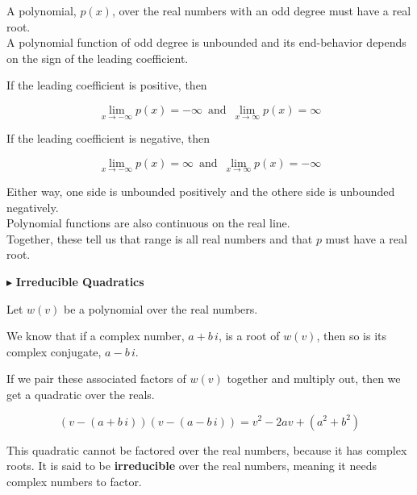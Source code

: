 \documentclass{ximera}
\begin{document}
\begin{explanation}


A polynomial, $p(x)$, over the real numbers with an odd degree must have a real root. \\




A polynomial function of odd degree is unbounded and its end-behavior depends on the sign of the leading coefficient.



If the leading coefficient is positive, then 

\[   \lim\limits_{x \to -\infty} p(x) = -\infty    \,   \text{ and } \,       \lim\limits_{x \to \infty} p(x) = \infty      \]



If the leading coefficient is negative, then 

\[   \lim\limits_{x \to -\infty} p(x) = \infty    \,   \text{ and } \,       \lim\limits_{x \to \infty} p(x) = -\infty      \]


Either way, one side is unbounded positively and the othere side is unbounded negatively. \\



Polynomial functions are also continuous on the real line. \\


Together, these tell us that range is all real numbers and that $p$ must have a real root.




\end{explanation}








$\blacktriangleright$  \textbf{Irreducible Quadratics}


Let $w(v)$ be a polynomial over the real numbers.

We know that if a complex number, $a + b \, i$, is a root of $w(v)$, then so is its complex conjugate, $a - b \,i$.

If we pair these associated factors of $w(v)$ together and multiply out, then we get a quadratic over the reals.

\[    (v - (a + b \, i)) (v -(a - b \, i))  = v^2 - 2a v + (a^2 + b^2)      \]


This quadratic cannot be factored over the real numbers, because it has complex roots.  It is said to be \textbf{irreducible} over the real numbers, meaning it needs complex numbers to factor.
\end{document}
